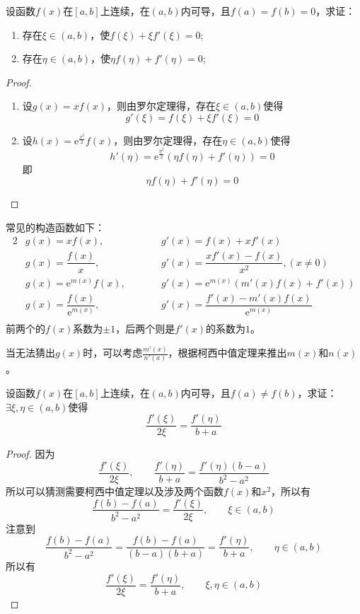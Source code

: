 \begin{example}
    设函数$f(x)$在$[a,b]$上连续，在$(a,b)$内可导，且$f(a)=f(b)=0$，求证：
    \begin{enumerate}[(1)]
        \item 存在$\xi\in(a,b)$，使$f(\xi)+\xi f'(\xi)=0$;
        \item 存在$\eta\in(a,b)$，使$\eta f(\eta) + f'(\eta)=0$;
    \end{enumerate}
\end{example}
\begin{proof}
    \begin{enumerate}[(1)]
        \item 设$g(x)=xf(x)$，则由罗尔定理得，存在$\xi\in(a,b)$使得
              \[ g'(\xi)=f(\xi)+\xi f'(\xi)=0 \]
        \item 设$h(x)=\mathrm{e}^{\frac{x^2}{2}}f(x)$，则由罗尔定理得，存在$\eta\in(a,b)$使得
              \[ h'(\eta) = \mathrm{e}^{\frac{\eta^2}{2}}(\eta f(\eta)+f'(\eta)) = 0 \]
              即
              \[ \eta f(\eta) + f'(\eta)=0 \]
    \end{enumerate}
\end{proof}
常见的构造函数如下：
\begin{alignat*}{2}
     & g(x)=xf(x),                           & \qquad & g'(x)=f(x)+xf'(x)                                  \\
     & g(x)=\dfrac{f(x)}{x},                 & \qquad & g'(x) = \dfrac{xf'(x)-f(x)}{x^2}, (x\neq 0)        \\
     & g(x)=\mathrm{e}^{m(x)}f(x),           & \qquad & g'(x) = \mathrm{e}^{m(x)}(m'(x)f(x)+f'(x))         \\
     & g(x)=\dfrac{f(x)}{\mathrm{e}^{m(x)}}, & \qquad & g'(x) = \dfrac{f'(x)-m'(x)f(x)}{\mathrm{e}^{m(x)}} \\
\end{alignat*}
前两个的$f(x)$系数为$\pm1$，后两个则是$f'(x)$的系数为$1$。

当无法猜出$g(x)$时，可以考虑$\frac{m'(x)}{n'(x)}$，根据柯西中值定理来推出$m(x)$和$n(x)$。

\begin{example}
    设函数$f(x)$在$[a,b]$上连续，在$(a,b)$内可导，且$f(a)\neq f(b)$，求证：$\exists \xi,\eta \in (a,b)$使得
    \[ \frac{f'(\xi)}{2\xi} = \frac{f'(\eta)}{b+a} \]
\end{example}
\begin{proof}
    因为
    \[ \frac{f'(\xi)}{2\xi}, \qquad \frac{f'(\eta)}{b+a} = \frac{f'(\eta)(b-a)}{b^2-a^2} \]
    所以可以猜测需要柯西中值定理以及涉及两个函数$f(x)$和$x^2$，所以有
    \[ \frac{f(b)-f(a)}{b^2-a^2} = \frac{f'(\xi)}{2\xi}, \qquad \xi\in(a,b) \]
    注意到
    \[ \frac{f(b)-f(a)}{b^2-a^2} = \frac{f(b)-f(a)}{(b-a)(b+a)} = \frac{f'(\eta)}{b+a}, \qquad \eta\in(a,b)\]
    所以有
    \[ \frac{f'(\xi)}{2\xi} = \frac{f'(\eta)}{b+a}, \qquad \xi,\eta\in(a,b) \]
\end{proof}


